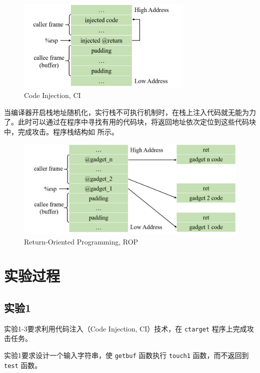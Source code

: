 \documentclass[12pt,a4paper]{article}
\begin{document}
\begin{figure}[H]
    \hspace*{55pt}
    \includegraphics[width=0.75\textwidth]{./fig/ci.png}
    \caption{Code Injection, CI}
    \label{figure:ci}
\end{figure}

当编译器开启栈地址随机化，实行栈不可执行机制时，在栈上注入代码就无能为力了。此时可以通过在程序中寻找有用的代码块，将返回地址依次定位到这些代码块中，完成攻击。程序栈结构如  所示。

\begin{figure}[H]

    \includegraphics[width=\textwidth]{./fig/rop.png}
    \caption{Return-Oriented Programming, ROP}
    \label{figure:rop}
\end{figure}

\section{实验过程}

\subsection{实验1}
\label{subsection:exp_1}

实验1-3要求利用代码注入（Code Injection, CI）技术，在 \verb|ctarget| 程序上完成攻击任务。

实验1要求设计一个输入字符串，使 \verb|getbuf| 函数执行 \verb|touch1| 函数，而不返回到 \verb|test| 函数。
\end{document}
